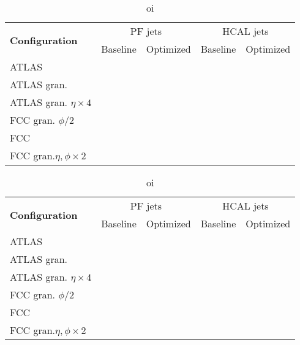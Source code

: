 \begin{table}[h]
	\caption{oi}
	\label{table:sum_DM}
	\centering
	\begin{tabular}{lcccc}
		\hline
		\multirow{2}{*}{\textbf{Configuration}} & \multicolumn{2}{c}{PF jets}    & \multicolumn{2}{c}{HCAL jets} \\ \cline{2-5} 
		& Baseline & Optimized & Baseline  & Optimized           \\ \midrule \midrule
		ATLAS&  &                       &           &           \\ 
		\rowcolor{black!7}ATLAS gran.&  &  &           &           \\ 
		ATLAS gran. $\eta\times 4$&  &  &           &           \\ 
		\rowcolor{black!7}FCC gran. $\phi/2$&  &  &           &           \\ 
		FCC&  &  &           &           \\ 
		\rowcolor{black!7}FCC gran.$\eta,\phi \times 2$&  &  &           &           \\ \bottomrule
	\end{tabular}
	
\end{table}

\begin{table}[h]
	\caption{oi}
	\label{table:sum_2HDM}
	\centering
	\begin{tabular}{lcccc}
		\hline
		\multirow{2}{*}{\textbf{Configuration}} & \multicolumn{2}{c}{PF jets}    & \multicolumn{2}{c}{HCAL jets} \\ \cline{2-5} 
		& Baseline & Optimized & Baseline  & Optimized           \\ \midrule \midrule
		ATLAS&  &                       &           &           \\ 
		\rowcolor{black!7}ATLAS gran.&  &  &           &           \\ 
		ATLAS gran. $\eta\times 4$&  &  &           &           \\ 
		\rowcolor{black!7}FCC gran. $\phi/2$&  &  &           &           \\ 
		FCC&  &  &           &           \\ 
		\rowcolor{black!7}FCC gran.$\eta,\phi \times 2$&  &  &           &           \\ \bottomrule
	\end{tabular}
	
\end{table}

